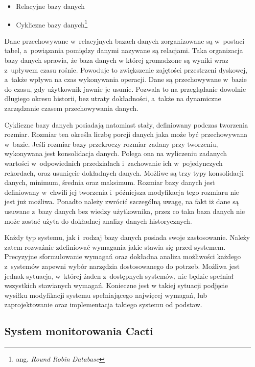 \begin{itemize}
\item Relacyjne bazy danych
\item Cykliczne bazy danych\footnote{ang. {\em Round Robin Database}}
\end{itemize}

Dane przechowywane w~relacyjnych bazach danych zorganizowane są
w~postaci tabel, a~powiązania pomiędzy danymi nazywane są
relacjami. Taka organizacja bazy danych sprawia, że baza danych w
której gromadzone są wyniki wraz z~upływem czasu rośnie. Powoduje to
zwiększenie zajętości przestrzeni dyskowej, a~także wpływa na czas
wykonywania operacji. Dane są przechowywane w~bazie do czasu, gdy
użytkownik jawnie je usunie. Pozwala to na przeglądanie dowolnie
długiego okresu historii, bez utraty dokładności, a~także na
dynamiczne zarządzanie czasem przechowywania danych.

Cykliczne bazy danych posiadają natomiast stały, definiowany podczas
tworzenia rozmiar. Rozmiar ten określa liczbę porcji danych jaka może
być przechowywana w~bazie. Jeśli rozmiar bazy przekroczy rozmiar
zadany przy tworzeniu, wykonywana jest konsolidacja danych. Polega ona
na wyliczeniu zadanych wartości w~odpowiednich przedziałach
i~zachowanie ich w~pojedynczych rekordach, oraz usunięcie dokładnych
danych. Możliwe są trzy typy konsolidacji danych, minimum, średnia
oraz maksimum. Rozmiar bazy danych jest definiowany w~chwili jej
tworzenia i~późniejsza modyfikacja tego rozmiaru nie jest już
możliwa. Ponadto należy zwrócić szczególną uwagę, na fakt iż dane są
usuwane z~bazy danych bez wiedzy użytkownika, przez co taka baza
danych nie może zostać użyta do dokładnej analizy danych
historycznych.

Każdy typ systemu, jak i~rodzaj bazy danych posiada swoje
zastosowanie. Należy zatem rozważnie zdefiniować wymagania jakie
stawia się przed systemem. Precyzyjne sformułowanie wymagań oraz
dokładna analiza możliwości każdego z~systemów zapewni wybór narzędzia
dostosowanego do potrzeb. Możliwa jest jednak sytuacja, w~której żaden
z~dostępnych systemów, nie będzie spełniał wszystkich stawianych
wymagań. Konieczne jest w takiej sytuacji podjęcie wysiłku modyfikacji
systemu spełniającego najwięcej wymagań, lub zaprojektowanie oraz
implementacja takiego systemu od podstaw.

\subsection[Cacti][System monitorowania Cacti]{System monitorowania Cacti}

